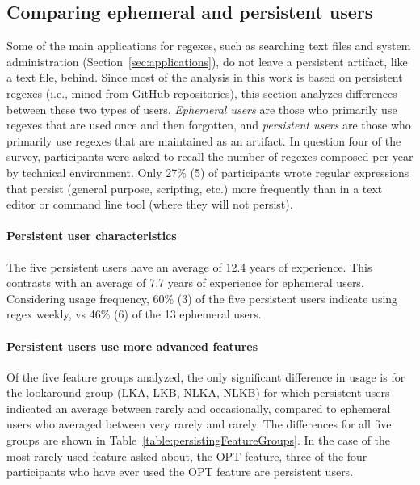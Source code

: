 \subsection{Comparing ephemeral and persistent users}
Some of the main applications for regexes, such as searching text files and system administration (Section~\ref{sec:applications}), do not leave a persistent artifact, like a text file, behind.  Since most of the analysis in this work is based on persistent regexes (i.e., mined from GitHub repositories), this section analyzes differences between these two types of users.  \emph{Ephemeral users} are those who primarily use regexes that are used once and then forgotten, and \emph{persistent users} are those who primarily use regexes that are maintained as an artifact.  In question four of the survey, participants were asked to recall the number of regexes composed per year by technical environment. Only 27\% (5) of participants wrote regular expressions that persist (general purpose, scripting, etc.) more frequently than in a text editor or command line tool (where they will not persist).

\paragraph{Persistent user characteristics} The five persistent users have an average of 12.4 years of experience.  This contrasts with an average of 7.7 years of experience for ephemeral users.  Considering usage frequency, 60\% (3) of the five persistent users indicate using regex weekly, vs 46\% (6) of the 13 ephemeral users.



\paragraph{Persistent users use more advanced features} Of the five feature groups analyzed, the only significant difference in usage is for the lookaround group (LKA, LKB, NLKA, NLKB) for which persistent users indicated an average between rarely and occasionally, compared to ephemeral users who averaged between very rarely and rarely.  The differences for all five groups are shown in Table~\ref{table:persistingFeatureGroups}. In the case of the most rarely-used feature asked about, the OPT feature, three of the four participants who have ever used the OPT feature are persistent users.

